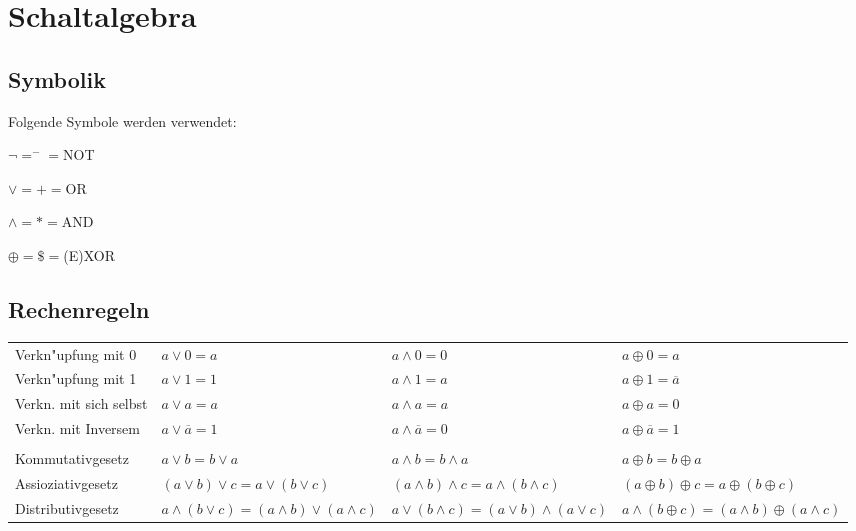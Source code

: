 \section{Schaltalgebra}
\subsection{Symbolik}
	Folgende Symbole werden verwendet:\\
	\begin{multicols}{4}
		$\neg=^-=$NOT
	\columnbreak
	
		$\vee=+=$OR
	\columnbreak
	
		$\wedge=*=$AND
	\columnbreak
	
		$\oplus=\$=$(E)XOR
	\end{multicols}
	
\subsection{Rechenregeln}
	\begin{tabular}{llll}
		Verkn"upfung mit 0 & $ a \vee 0 = a $ & $ a \wedge 0 = 0 $ & $ a \oplus 0 = a $\\
		Verkn"upfung mit 1 & $ a \vee 1 = 1 $ & $ a \wedge 1 = a $ & $ a \oplus 1 = \overline{a} $ \\
		Verkn. mit sich selbst & $ a \vee a = a $ & $ a \wedge a = a $ & $ a \oplus a = 0 $ \\
		Verkn. mit Inversem & $ a \vee \overline{a} = 1 $ & $ a \wedge \overline{a} = 0 $ & $ a \oplus \overline{a} = 1 $ \\
		\\
		Kommutativgesetz & $ a \vee b = b \vee a $ & $ a \wedge b = b \wedge a $ & $ a \oplus b = b \oplus a $\\
		Assioziativgesetz & $ (a \vee b) \vee c = a \vee (b \vee c) $ & $ (a \wedge b) \wedge c = a \wedge (b \wedge c) $ & $ (a \oplus b) \oplus c = a \oplus (b \oplus c) $ \\
		Distributivgesetz & $ a \wedge (b \vee c) = (a \wedge b) \vee (a \wedge c) $ & $ a \vee (b \wedge c) = (a \vee b) \wedge (a \vee c) $ & $ a \wedge (b \oplus c) = (a \wedge b) \oplus (a \wedge c) $ \\	
		\end{tabular}
		
